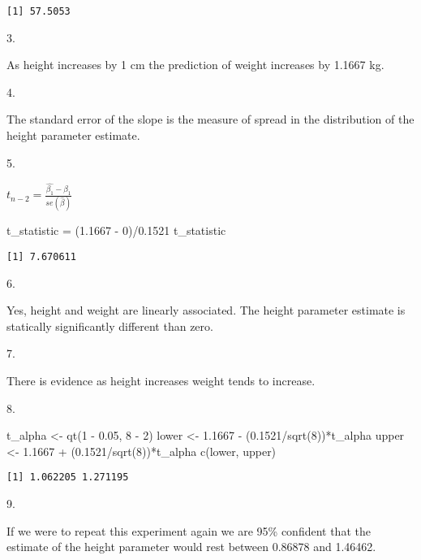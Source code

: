 \documentclass[
  letterpaper,
  DIV=11,
  numbers=noendperiod]{scrartcl}
\newenvironment{Shaded}{\begin{snugshade}}{\end{snugshade}}
\newcommand{\DecValTok}[1]{\textcolor[rgb]{0.68,0.00,0.00}{#1}}
\newcommand{\FloatTok}[1]{\textcolor[rgb]{0.68,0.00,0.00}{#1}}
\newcommand{\FunctionTok}[1]{\textcolor[rgb]{0.28,0.35,0.67}{#1}}
\newcommand{\NormalTok}[1]{\textcolor[rgb]{0.00,0.23,0.31}{#1}}
\newcommand{\OtherTok}[1]{\textcolor[rgb]{0.00,0.23,0.31}{#1}}
\newcommand{\SpecialCharTok}[1]{\textcolor[rgb]{0.37,0.37,0.37}{#1}}
\begin{document}
\begin{verbatim}
[1] 57.5053
\end{verbatim}

3.

As height increases by 1 cm the prediction of weight increases by 1.1667
kg.

4.

The standard error of the slope is the measure of spread in the
distribution of the height parameter estimate.

5.

\(t_{n-2}=\frac{\hat{\beta_1}-\beta_1}{se(\hat{\beta})}\)

\begin{Shaded}
\begin{Highlighting}[]
\NormalTok{t\_statistic }\OtherTok{=}\NormalTok{ (}\FloatTok{1.1667} \SpecialCharTok{{-}} \DecValTok{0}\NormalTok{)}\SpecialCharTok{/}\FloatTok{0.1521}
\NormalTok{t\_statistic}
\end{Highlighting}
\end{Shaded}

\begin{verbatim}
[1] 7.670611
\end{verbatim}

6.

Yes, height and weight are linearly associated. The height parameter
estimate is statically significantly different than zero.

7.

There is evidence as height increases weight tends to increase.

8.

\begin{Shaded}
\begin{Highlighting}[]
\NormalTok{t\_alpha }\OtherTok{\textless{}{-}} \FunctionTok{qt}\NormalTok{(}\DecValTok{1} \SpecialCharTok{{-}} \FloatTok{0.05}\NormalTok{, }\DecValTok{8} \SpecialCharTok{{-}} \DecValTok{2}\NormalTok{)}
\NormalTok{lower }\OtherTok{\textless{}{-}} \FloatTok{1.1667} \SpecialCharTok{{-}}\NormalTok{ (}\FloatTok{0.1521}\SpecialCharTok{/}\FunctionTok{sqrt}\NormalTok{(}\DecValTok{8}\NormalTok{))}\SpecialCharTok{*}\NormalTok{t\_alpha}
\NormalTok{upper }\OtherTok{\textless{}{-}} \FloatTok{1.1667} \SpecialCharTok{+}\NormalTok{ (}\FloatTok{0.1521}\SpecialCharTok{/}\FunctionTok{sqrt}\NormalTok{(}\DecValTok{8}\NormalTok{))}\SpecialCharTok{*}\NormalTok{t\_alpha}
\FunctionTok{c}\NormalTok{(lower, upper)}
\end{Highlighting}
\end{Shaded}

\begin{verbatim}
[1] 1.062205 1.271195
\end{verbatim}

9.

If we were to repeat this experiment again we are 95\% confident that
the estimate of the height parameter would rest between 0.86878 and
1.46462.
\end{document}
